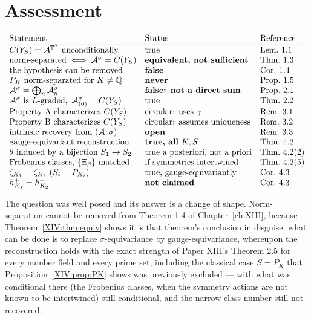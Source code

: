\section{Assessment}

\[
\begin{array}{lll}
\text{Statement} & \text{Status} & \text{Reference}\\\hline
C(Y_S)=\cA^{\T^S}\ \text{unconditionally} & \text{true} & \text{Lem.~1.1}\\
\text{norm-separated}\iff\cA^\sigma=C(Y_S) & \textbf{equivalent, not sufficient} & \text{Thm.~1.3}\\
\text{the hypothesis can be removed} & \textbf{false} & \text{Cor.~1.4}\\
P_K\ \text{norm-separated for}\ K\ne\Q & \textbf{never} & \text{Prop.~1.5}\\
\cA^\sigma=\bigoplus_n\cA^\sigma_n & \textbf{false: not a direct sum} & \text{Prop.~2.1}\\
\cA^\sigma\ \text{is}\ L\text{-graded},\ \cA^\sigma_{(0)}=C(Y_S) & \text{true} & \text{Thm.~2.2}\\
\text{Property A characterizes}\ C(Y_S) & \text{circular: uses}\ \gamma & \text{Rem.~3.1}\\
\text{Property B characterizes}\ C(Y_S) & \text{circular: assumes uniqueness} & \text{Rem.~3.2}\\
\text{intrinsic recovery from}\ (\cA,\sigma) & \textbf{open} & \text{Rem.~3.3}\\
\text{gauge-equivariant reconstruction} & \textbf{true, all}\ K,S & \text{Thm.~4.2}\\
\theta\ \text{induced by a bijection}\ S_1\to S_2 & \text{true a posteriori, not a priori} & \text{Thm.~4.2(2)}\\
\text{Frobenius classes, }\{\Xi_\beta\}\ \text{matched} & \text{if symmetries intertwined} & \text{Thm.~4.2(5)}\\
\zeta_{K_1}=\zeta_{K_2}\ (S_i=P_{K_i}) & \text{true, gauge-equivariantly} & \text{Cor.~4.3}\\
h^+_{K_1}=h^+_{K_2} & \textbf{not claimed} & \text{Cor.~4.3}\\
\end{array}
\]

The question was well posed and its answer is a change of shape. Norm-separation cannot be
removed from Theorem 1.4 of Chapter~\ref{ch:XIII}, because Theorem~\ref{XIV:thm:equiv} shows it is that
theorem's conclusion in disguise; what can be done is to replace $\sigma$-equivariance by
gauge-equivariance, whereupon the reconstruction holds with the exact strength of Paper
XIII's Theorem 2.5 for every number field and every prime set, including the classical case
$S=P_K$ that Proposition~\ref{XIV:prop:PK} shows was previously excluded --- with what was
conditional there (the Frobenius classes, when the symmetry actions are not known to be
intertwined) still conditional, and the narrow class number still not recovered.

